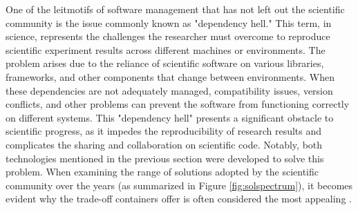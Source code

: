 
One of the leitmotifs of software management that has not left out the
scientific community is the issue commonly known as "dependency hell." This
term,  in science, represents the challenges the researcher must overcome to
reproduce scientific experiment results across different machines or
environments. The problem arises due to the reliance of scientific software on
various libraries, frameworks, and other components that change between
environments. When these dependencies are not adequately managed, compatibility
issues, version conflicts, and other problems can prevent the software from
functioning correctly on different systems. This "dependency hell" presents a
significant obstacle to scientific progress, as it impedes the reproducibility
of research results and complicates the sharing and collaboration on scientific
code. Notably, both technologies mentioned in the previous section were
developed to solve this problem. When examining the range of solutions adopted
by the scientific community over the years (as summarized in Figure
\ref{fig:solspectrum}), it becomes evident why the trade-off containers offer is
often considered the most appealing \cite{sarusso}.


